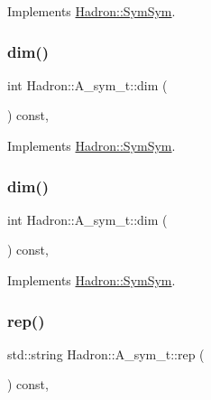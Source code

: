Implements \mbox{\hyperlink{structHadron_1_1SymSym_ae57780f41b9f6c03c6056eed3677bd48}{Hadron\+::\+Sym\+Sym}}.

\mbox{\label{structHadron_1_1A__sym__t_a57e9460ee09050859f969d1f0cae0e92}} 
\subsubsection{\texorpdfstring{dim()}{dim()}\hspace{0.1cm}{\footnotesize\ttfamily [2/3]}}
{\footnotesize\ttfamily int Hadron\+::\+A\+\_\+sym\+\_\+t\+::dim (\begin{DoxyParamCaption}{ }\end{DoxyParamCaption}) const\hspace{0.3cm}{\ttfamily [inline]}, {\ttfamily [virtual]}}



Implements \mbox{\hyperlink{structHadron_1_1SymSym_ae57780f41b9f6c03c6056eed3677bd48}{Hadron\+::\+Sym\+Sym}}.

\mbox{\label{structHadron_1_1A__sym__t_a57e9460ee09050859f969d1f0cae0e92}} 
\subsubsection{\texorpdfstring{dim()}{dim()}\hspace{0.1cm}{\footnotesize\ttfamily [3/3]}}
{\footnotesize\ttfamily int Hadron\+::\+A\+\_\+sym\+\_\+t\+::dim (\begin{DoxyParamCaption}{ }\end{DoxyParamCaption}) const\hspace{0.3cm}{\ttfamily [inline]}, {\ttfamily [virtual]}}



Implements \mbox{\hyperlink{structHadron_1_1SymSym_ae57780f41b9f6c03c6056eed3677bd48}{Hadron\+::\+Sym\+Sym}}.

\mbox{\label{structHadron_1_1A__sym__t_ac60fe125eeb713995aafa4712e23f919}} 
\subsubsection{\texorpdfstring{rep()}{rep()}\hspace{0.1cm}{\footnotesize\ttfamily [1/3]}}
{\footnotesize\ttfamily std\+::string Hadron\+::\+A\+\_\+sym\+\_\+t\+::rep (\begin{DoxyParamCaption}{ }\end{DoxyParamCaption}) const\hspace{0.3cm}{\ttfamily [inline]}, {\ttfamily [virtual]}}



